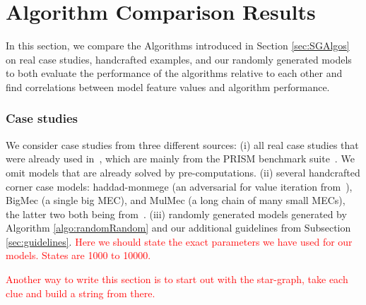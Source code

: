 \section{Algorithm Comparison Results}

In this section, we compare the Algorithms introduced in Section \ref{sec:SGAlgos} on real case studies, handcrafted examples, and our randomly generated models to both evaluate the 
performance of the algorithms relative to each other and find correlations between model feature values and algorithm performance.

\subsubsection*{Case studies}
We consider case studies from three different sources: 
(i) all real case studies that were already used in~\cite{gandalf20}, which are mainly from the PRISM benchmark suite~\cite{PRISMben}. We omit models that are already solved by pre-computations.
(ii) several handcrafted corner case models: haddad-monmege (an adversarial for value iteration from~\cite{haddadmonmege}), BigMec (a single big MEC), and MulMec (a long chain of many small MECs), the latter two both being from~\cite{gandalf}.
(iii) randomly generated models generated by Algorithm \ref{algo:randomRandom} and our additional guidelines from Subsection \ref{sec:guidelines}.
\textcolor{red}{Here we should state the exact parameters we have used for our models. States are 1000 to 10000.}


\textcolor{red}{Another way to write this section is to start out with the star-graph, take each clue and build a string from there.}

